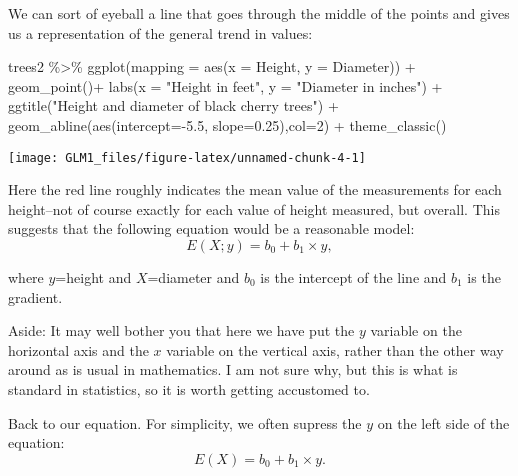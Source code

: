 \documentclass[
]{article}
\newenvironment{Shaded}{\begin{snugshade}}{\end{snugshade}}
\newcommand{\AttributeTok}[1]{\textcolor[rgb]{0.77,0.63,0.00}{#1}}
\newcommand{\DecValTok}[1]{\textcolor[rgb]{0.00,0.00,0.81}{#1}}
\newcommand{\FloatTok}[1]{\textcolor[rgb]{0.00,0.00,0.81}{#1}}
\newcommand{\FunctionTok}[1]{\textcolor[rgb]{0.00,0.00,0.00}{#1}}
\newcommand{\NormalTok}[1]{#1}
\newcommand{\SpecialCharTok}[1]{\textcolor[rgb]{0.00,0.00,0.00}{#1}}
\newcommand{\StringTok}[1]{\textcolor[rgb]{0.31,0.60,0.02}{#1}}
\begin{document}
We can sort of eyeball a line that goes through the middle of the points
and gives us a representation of the general trend in values:

\begin{Shaded}
\begin{Highlighting}[]
\NormalTok{    trees2 }\SpecialCharTok{\%\textgreater{}\%}
      \FunctionTok{ggplot}\NormalTok{(}\AttributeTok{mapping =} \FunctionTok{aes}\NormalTok{(}\AttributeTok{x =}\NormalTok{ Height, }\AttributeTok{y =}\NormalTok{ Diameter)) }\SpecialCharTok{+}
      \FunctionTok{geom\_point}\NormalTok{()}\SpecialCharTok{+}
      \FunctionTok{labs}\NormalTok{(}\AttributeTok{x =} \StringTok{"Height in feet"}\NormalTok{, }\AttributeTok{y =} \StringTok{"Diameter in inches"}\NormalTok{) }\SpecialCharTok{+}
      \FunctionTok{ggtitle}\NormalTok{(}\StringTok{"Height and diameter of black cherry trees"}\NormalTok{) }\SpecialCharTok{+}
      \FunctionTok{geom\_abline}\NormalTok{(}\FunctionTok{aes}\NormalTok{(}\AttributeTok{intercept=}\SpecialCharTok{{-}}\FloatTok{5.5}\NormalTok{, }\AttributeTok{slope=}\FloatTok{0.25}\NormalTok{),}\AttributeTok{col=}\DecValTok{2}\NormalTok{) }\SpecialCharTok{+}
      \FunctionTok{theme\_classic}\NormalTok{()}
\end{Highlighting}
\end{Shaded}

\begin{center}\texttt{[image: GLM1\_files/figure-latex/unnamed-chunk-4-1]} \end{center}

Here the red line roughly indicates the mean value of the measurements
for each height--not of course exactly for each value of height
measured, but overall. This suggests that the following equation would
be a reasonable model:\\
\[
E(X;y) = b_0 + b_1\times y,
\]

where \(y\)=height and \(X\)=diameter and \(b_0\) is the intercept of
the line and \(b_1\) is the gradient.

Aside: It may well bother you that here we have put the \(y\) variable
on the horizontal axis and the \(x\) variable on the vertical axis,
rather than the other way around as is usual in mathematics. I am not
sure why, but this is what is standard in statistics, so it is worth
getting accustomed to.

Back to our equation. For simplicity, we often supress the \(y\) on the
left side of the equation:\\
\[ 
E(X) = b_0 + b_1\times y.
\]
\end{document}
